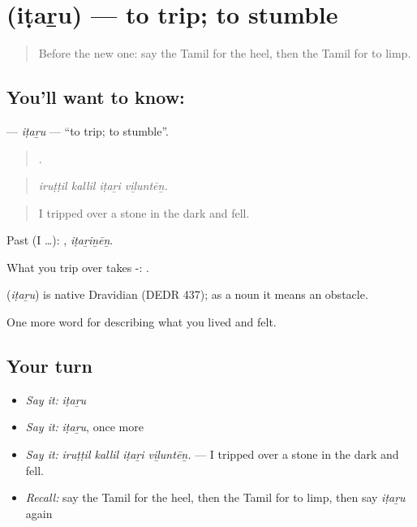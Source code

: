 \section[\texorpdfstring{\ta{இடறு} (iṭaṟu)}{இடறு (iṭaṟu)}]{ (iṭaṟu) — to trip; to stumble}

\label{lesson:TA-C481-itaru}



\begin{quote}
Before the new one: say the Tamil for the heel, then the Tamil for to limp.
\end{quote}

\subsection*{You'll want to know: }
\textbf{} — \emph{iṭaṟu} — \textquotedblleft{}to trip; to stumble\textquotedblright{}.

\begin{quote}
   .
\end{quote}

\begin{quote}
\emph{iruṭṭil kallil iṭaṟi viḻuntēṉ.}
\end{quote}

\begin{quote}
I tripped over a stone in the dark and fell.
\end{quote}

Past (I …): , \emph{iṭaṟiṉēṉ}.

What you trip over takes -:  .

\begin{cousinweb}
\textbf{} (\emph{iṭaṟu}) is native Dravidian (DEDR 437); as a noun it means an obstacle.
\end{cousinweb}

\begin{grammarlens}[title={What you've built}]
One more word for describing what you lived and felt.
\end{grammarlens}

\subsection*{Your turn}
\begin{itemize}
\raggedright
  \item \emph{Say it:} \emph{iṭaṟu}
  \item \emph{Say it:} \emph{iṭaṟu}, once more
  \item \emph{Say it:} \emph{iruṭṭil kallil iṭaṟi viḻuntēṉ.} — I tripped over a stone in the dark and fell.
  \item \emph{Recall:} say the Tamil for the heel, then the Tamil for to limp, then say \emph{iṭaṟu} again
\end{itemize}

